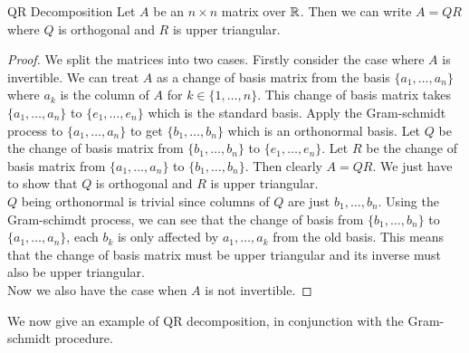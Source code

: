 \documentclass[a4paper]{article}
\begin{document}
\begin{thm}{QR Decomposition}{} Let $A$ be an $n\times n$ matrix over $\mathbb{R}$. Then we can write $A=QR$ where $Q$ is orthogonal and $R$ is upper triangular. 
\begin{proof}We split the matrices into two cases. Firstly consider the case where $A$ is invertible. We can treat $A$ as a change of basis matrix from the basis $\{a_1,\dots,a_n\}$ where $a_k$ is the column of $A$ for $k\in\{1,\dots,n\}$. This change of basis matrix takes $\{a_1,\dots,a_n\}$ to $\{e_1,\dots,e_n\}$ which is the standard basis. Apply the Gram-schmidt process to $\{a_1,\dots,a_n\}$ to get $\{b_1,\dots,b_n\}$ which is an orthonormal basis. Let $Q$ be the change of basis matrix from $\{b_1,\dots,b_n\}$ to $\{e_1,\dots,e_n\}$. Let $R$ be the change of basis matrix from $\{a_1,\dots,a_n\}$ to $\{b_1,\dots,b_n\}$. Then clearly $A=QR$. We just have to show that $Q$ is orthogonal and $R$ is upper triangular. \\
$Q$ being orthonormal is trivial since columns of $Q$ are just $b_1,\dots,b_n$. Using the Gram-schimdt process, we can see that the change of basis from $\{b_1,\dots,b_n\}$ to $\{a_1,\dots,a_n\}$, each $b_k$ is only affected by $a_1,\dots,a_k$ from the old basis. This means that the change of basis matrix must be upper triangular and its inverse must also be upper triangular. \\
Now we also have the case when $A$ is not invertible. 
\end{proof}
\end{thm}

We now give an example of QR decomposition, in conjunction with the Gram-schmidt procedure. 
\end{document}
